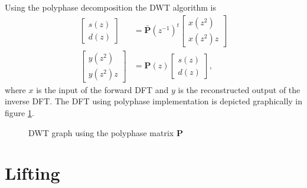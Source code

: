 \begin{refsection}
Using the polyphase decomposition the DWT algorithm is
\begin{align}
\begin{bmatrix}
	s(z) \\
	d(z)
\end{bmatrix}
&=
\bm{\bar P}(z^{-1})^t
\begin{bmatrix}
	x(z^2) \\     
	x(z^2) z
\end{bmatrix}
\\
\begin{bmatrix}
	y(z^2) \\
	y(z^2) z
\end{bmatrix}
&=
\bm P(z)
\begin{bmatrix}
	s(z) \\
	d(z)
\end{bmatrix}
,
\end{align}
where $x$ is the input of the forward DFT and $y$ is the reconstructed output of the inverse DFT.
The DFT using polyphase implementation is depicted graphically in figure \ref{fpga:fig:liftingSteps}.
\begin{figure}
	\centering
	
	\caption{DWT graph using the polyphase matrix $\bm P$}
	\label{fpga:fig:liftingSteps}
\end{figure}


\section{Lifting}


\end{refsection}

